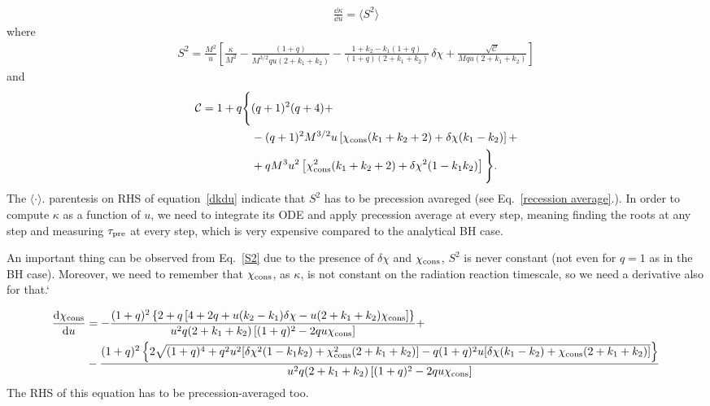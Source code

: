 \documentclass[floats,floatfix,showpacs,amssymb,prd,twocolumn,superscriptaddress,nofootinbib,nolongbibliography,reprint,onecolumn]{revtex4-2}
\newcommand{\deltachi}{\delta \chi}
\newcommand{\chicons}{\chi_{\rm cons}}
\begin{document}
 \begin{align}\label{dkdu}
 \frac{\dd \kappa}{\dd u} =  \langle S^2 \rangle
 \end{align}
 where
  \begin{align}\label{S2}
 S^2=\frac{M^2}{ u}\left[\frac{\kappa}{M^2}-\frac{(1+q)}{M^{3/2}q u (2+k_1+k_2)}-\frac{1+k_2-k_1(1+q)}
{(1+q)(2+k_1+k_2)}
\, \delta\chi+ \frac{\sqrt{\mathcal{C}}}{M qu (2+k_1+k_2)}\right] 
 \end{align}
 and
\begin{align}
\mathcal{C} = 1 + q \Bigg\{&(q+1)^2 (q+4)+\\ &-(q+1)^2 M^{3/2} u \left[\chi_{\rm cons}(k_1+k_2+2)
+\delta\chi (k_1-k_2)\right]+\\ &+ q M^3 u^2\left[\chi_{\rm cons}^2 (k_1+k_2+2)+\delta\chi^2 (1-k_1k_2)\right]\Bigg\}.
\end{align}
The $\langle \cdot \rangle$. parentesis on RHS of equation~\ref{dkdu} indicate that $S^2$ has to be precession avareged (see Eq.~\ref{recession average}.). In order to compute $\kappa$ as a function of $u$, we need to integrate its ODE and apply precession average at every step, meaning finding the roots at any step and measuring $\tau_{\rm pre}$ at every step, which is very expensive compared to the analytical BH case.

An important thing can be observed from Eq.~\ref{S2} due to the presence of $\deltachi$ and $\chicons$, $S^2$ is never constant (not even for $q=1$ as in the BH case).
Moreover, we need to remember that $\chicons$, as $\kappa$,  is not constant on the radiation reaction timescale, so we need a derivative also for that.`

\begin{align}
\frac{\dd \chicons}{\dd u}&=- \frac{(1+q)^2 \left\{ 2+ q\left[ 4+2 q+  u (k_2-k_1)\deltachi - u (2+k_1+k_2) \chicons \right] \right\}}{u^2 q (2+k_1+k_2)  \left[ (1+q)^2-2 q u \chicons \right]} + \notag \\ &
- \frac{(1+q)^2 \left\{ 2 \sqrt{(1+q)^4 +  q^2 u^2 [ \delta \chi ^2 (1-k_1 k_2)+\chicons^2 (2+k_1+k_2)] - q (1+q)^2 u [\delta \chi  (k_1-k_2)+\chicons (2+k_1+k_2) ]}\right\}}{u^2 q (2+k_1+k_2)  \left[ (1+q)^2-2 q u \chicons \right]}
\end{align}
 The RHS of this equation has to be precession-averaged too.
\end{document}
